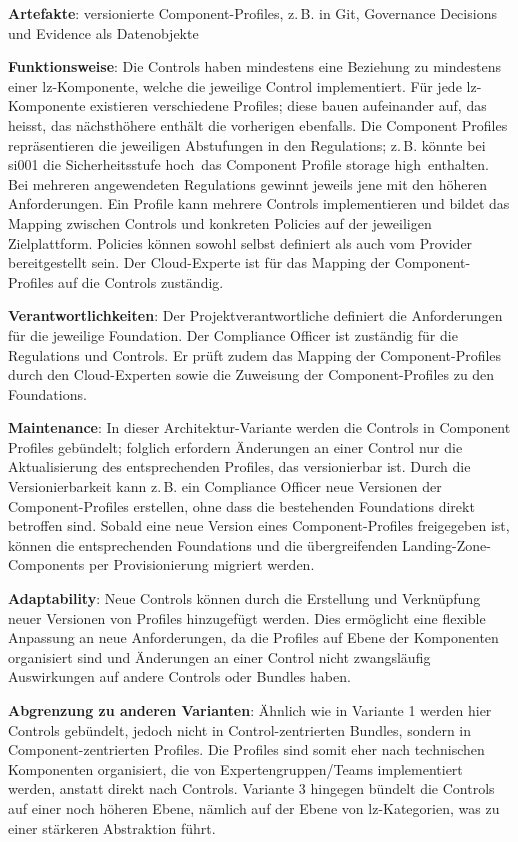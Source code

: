 \textbf{Artefakte}: versionierte Component-Profiles, z.\,B. in Git, Governance Decisions und Evidence als Datenobjekte

\textbf{Funktionsweise}: Die Controls haben mindestens eine Beziehung zu mindestens einer \ac{lz}-Komponente, welche die jeweilige Control implementiert. Für jede \ac{lz}-Komponente existieren verschiedene Profiles; diese bauen aufeinander auf, das heisst, das nächsthöhere enthält die vorherigen ebenfalls. Die Component Profiles repräsentieren die jeweiligen Abstufungen in den Regulations; z.\,B. könnte bei \ac{si001} die Sicherheitsstufe \flqq hoch\frqq\ das Component Profile \flqq storage high\frqq\ enthalten. Bei mehreren angewendeten Regulations gewinnt jeweils jene mit den höheren Anforderungen. Ein Profile kann mehrere Controls implementieren und bildet das Mapping zwischen Controls und konkreten Policies auf der jeweiligen Zielplattform. Policies können sowohl selbst definiert als auch vom Provider bereitgestellt sein. Der Cloud-Experte ist für das Mapping der Component-Profiles auf die Controls zuständig.

\textbf{Verantwortlichkeiten}: Der Projektverantwortliche definiert die Anforderungen für die jeweilige Foundation. Der Compliance Officer ist zuständig für die Regulations und Controls. Er prüft zudem das Mapping der Component-Profiles durch den Cloud-Experten sowie die Zuweisung der Component-Profiles zu den Foundations.

\textbf{Maintenance}: In dieser Architektur-Variante werden die Controls in Component Profiles gebündelt; folglich erfordern Änderungen an einer Control nur die Aktualisierung des entsprechenden Profiles, das versionierbar ist. Durch die Versionierbarkeit kann z.\,B. ein Compliance Officer neue Versionen der Component-Profiles erstellen, ohne dass die bestehenden Foundations direkt betroffen sind. Sobald eine neue Version eines Component-Profiles freigegeben ist, können die entsprechenden Foundations und die übergreifenden Landing-Zone-Components per Provisionierung migriert werden.

\textbf{Adaptability}: Neue Controls können durch die Erstellung und Verknüpfung neuer Versionen von Profiles hinzugefügt werden. Dies ermöglicht eine flexible Anpassung an neue Anforderungen, da die Profiles auf Ebene der Komponenten organisiert sind und Änderungen an einer Control nicht zwangsläufig Auswirkungen auf andere Controls oder Bundles haben.

\textbf{Abgrenzung zu anderen Varianten}: Ähnlich wie in Variante 1 werden hier Controls \flqq gebündelt\frqq, jedoch nicht in Control-zentrierten Bundles, sondern in Component-zentrierten Profiles. Die Profiles sind somit eher nach technischen Komponenten organisiert, die von Expertengruppen/Teams implementiert werden, anstatt direkt nach Controls. Variante 3 hingegen bündelt die Controls auf einer noch höheren Ebene, nämlich auf der Ebene von \ac{lz}-Kategorien, was zu einer stärkeren Abstraktion führt.

